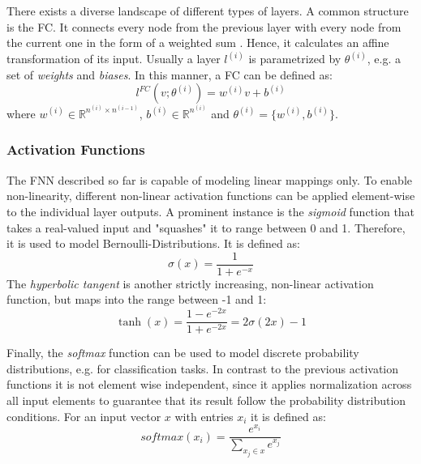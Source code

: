 There exists a diverse landscape of different types of layers. A common structure is the \ac{FC}. It connects every node from the previous layer with every node from the current one in the form of a weighted sum . Hence, it calculates an affine transformation of its input. Usually a layer $l^{(i)}$ is parametrized by $\theta^{(i)}$, e.g. a set of \textit{weights} and \textit{biases}. In this manner, a \ac{FC} can be defined as:
\begin{equation}
l^{FC}(v;\theta^{(i)}) = w^{(i)}v+b^{(i)} 
\end{equation}
where $w^{(i)} \in \mathbb{R}^{n^{(i)} \times n^{(i-1)}}$, $b^{(i)} \in \mathbb{R}^{n^{(i)}}$ and $\theta^{(i)}=\{w^{(i)}, b^{(i)}\}$. 

\subsubsection{Activation Functions}
The \ac{FNN} described so far is capable of modeling linear mappings only. To enable non-linearity, different non-linear activation functions can be applied element-wise to the individual layer outputs. A prominent instance is the \textit{sigmoid} function that takes a real-valued input and "squashes" it to range between 0 and 1. Therefore, it is used to model Bernoulli-Distributions. It is defined as:
\begin{equation}
\sigma(x)=\frac{1}{1+e^{-x}}
\end{equation}
The \textit{hyperbolic tangent} is another strictly increasing, non-linear activation function, but maps into the range between -1 and 1:
\begin{equation}
\tanh(x)=\frac{1-e^{-2x}}{1+e^{-2x}}=2\sigma(2x)-1
\end{equation}

Finally, the \textit{softmax} function can be used to model discrete probability distributions, e.g. for classification tasks. In contrast to the previous activation functions it is not element wise independent, since it applies normalization across all input elements to guarantee that its result follow the probability distribution conditions. For an input vector $x$ with entries $x_i$ it is defined as:
\begin{equation}
softmax(x_i) = \frac{e^{x_i}}{\sum\limits_{x_j \in x}e^{x_j}} 
\end{equation}

